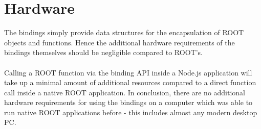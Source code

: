 \section{Hardware}

The bindings simply provide data structures for the encapsulation of ROOT objects and functions. Hence the additional hardware requirements of the bindings themselves 
should be negligible compared to ROOT's.\\ \\
Calling a ROOT function via the binding API inside a Node.js application will take up a minimal amount of additional resources compared to a direct function call inside a native ROOT application.
In conclusion, there are no additional hardware requirements for using the bindings on a computer which was able to run native ROOT applications before - this includes almost any modern desktop PC.
